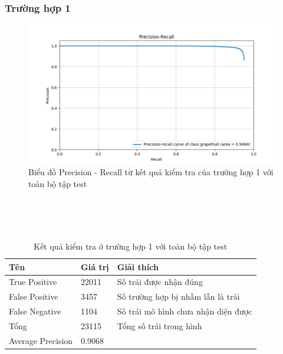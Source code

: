 \subsubsection{Trường hợp 1}
\begin{center}
    \begin{figure}[H]
    \centering
    \includegraphics[width=0.9\columnwidth]{images/chap3/curve_2.png}
    \caption{Biểu đồ Precision - Recall từ kết quả kiểm tra của trường hợp 1 với toàn bộ tập test}
    \label{fig:my_label}
    \end{figure}
\end{center}
~\\
~\\
~\\
\begin{table}[H]
    \begin{tabular}{p{4cm}  p{2.5cm}  p{5.5cm} }    
    \hline		
	Tên & Giá trị & Giải thích \\
	\hline
	True Positive & 22011 & Số trái được nhận đúng \\
	False Positive & 3457  & Số trường hợp bị nhầm lẫn là trái \\
	False Negative & 1104 & Số trái mô hình chưa nhận diện được \\

    \hline
    Tổng & 23115 & Tổng số trái trong hình \\
    
    \hline
	Average Precision & 0.9068 \\
	\hline
	\end{tabular}
	\caption{Kết quả kiểm tra ở trường hợp 1 với toàn bộ tập test}
    \label{chap3:case1:table01}    
\end{table}
